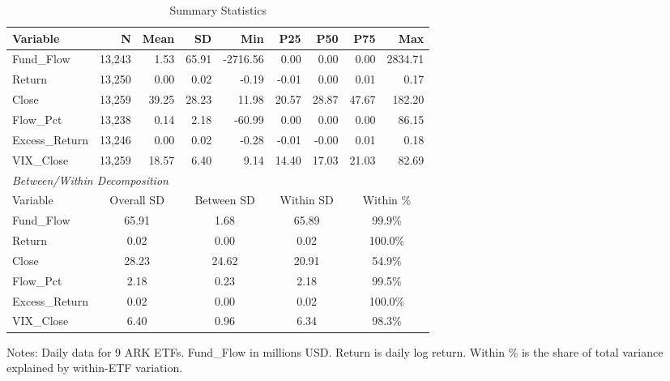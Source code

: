 \begin{table}[htbp]\centering
\caption{Summary Statistics}
\label{tab:summary}
\begin{tabular}{lrrrrrrrr}
\toprule
Variable & N & Mean & SD & Min & P25 & P50 & P75 & Max \\
\midrule
Fund\_Flow & 13,243 & 1.53 & 65.91 & -2716.56 & 0.00 & 0.00 & 0.00 & 2834.71 \\
Return & 13,250 & 0.00 & 0.02 & -0.19 & -0.01 & 0.00 & 0.01 & 0.17 \\
Close & 13,259 & 39.25 & 28.23 & 11.98 & 20.57 & 28.87 & 47.67 & 182.20 \\
Flow\_Pct & 13,238 & 0.14 & 2.18 & -60.99 & 0.00 & 0.00 & 0.00 & 86.15 \\
Excess\_Return & 13,246 & 0.00 & 0.02 & -0.28 & -0.01 & -0.00 & 0.01 & 0.18 \\
VIX\_Close & 13,259 & 18.57 & 6.40 & 9.14 & 14.40 & 17.03 & 21.03 & 82.69 \\
\midrule
\multicolumn{9}{l}{\textit{Between/Within Decomposition}} \\
Variable & \multicolumn{2}{c}{Overall SD} & \multicolumn{2}{c}{Between SD} & \multicolumn{2}{c}{Within SD} & \multicolumn{2}{c}{Within \%} \\
\midrule
Fund\_Flow & \multicolumn{2}{c}{65.91} & \multicolumn{2}{c}{1.68} & \multicolumn{2}{c}{65.89} & \multicolumn{2}{c}{99.9\%} \\
Return & \multicolumn{2}{c}{0.02} & \multicolumn{2}{c}{0.00} & \multicolumn{2}{c}{0.02} & \multicolumn{2}{c}{100.0\%} \\
Close & \multicolumn{2}{c}{28.23} & \multicolumn{2}{c}{24.62} & \multicolumn{2}{c}{20.91} & \multicolumn{2}{c}{54.9\%} \\
Flow\_Pct & \multicolumn{2}{c}{2.18} & \multicolumn{2}{c}{0.23} & \multicolumn{2}{c}{2.18} & \multicolumn{2}{c}{99.5\%} \\
Excess\_Return & \multicolumn{2}{c}{0.02} & \multicolumn{2}{c}{0.00} & \multicolumn{2}{c}{0.02} & \multicolumn{2}{c}{100.0\%} \\
VIX\_Close & \multicolumn{2}{c}{6.40} & \multicolumn{2}{c}{0.96} & \multicolumn{2}{c}{6.34} & \multicolumn{2}{c}{98.3\%} \\
\bottomrule
\end{tabular}
\begin{tablenotes}\small
\item Notes: Daily data for 9 ARK ETFs. Fund\_Flow in millions USD.
Return is daily log return. Within \% is the share of total variance
explained by within-ETF variation.
\end{tablenotes}
\end{table}